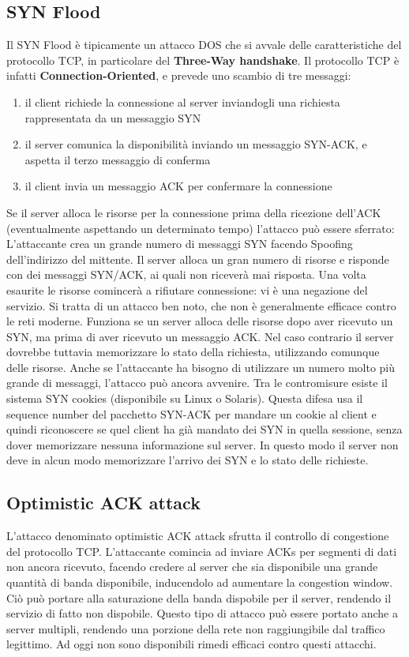 \subsection{SYN Flood}
Il SYN Flood è tipicamente un attacco DOS che si avvale delle caratteristiche del protocollo TCP, in particolare del \textbf{Three-Way handshake}. Il protocollo TCP è infatti \textbf{Connection-Oriented}, e prevede uno scambio di tre messaggi:
\begin{enumerate}
\item il client richiede la connessione al server inviandogli una richiesta rappresentata da un messaggio SYN
\item il server comunica la disponibilità inviando un messaggio SYN-ACK, e aspetta il terzo messaggio di conferma
\item il client invia un messaggio ACK per confermare la connessione
\end{enumerate}
Se il server alloca le risorse per la connessione prima della ricezione dell'ACK (eventualmente aspettando un determinato tempo) l'attacco può essere sferrato: L'attaccante crea un grande numero di messaggi SYN facendo Spoofing dell'indirizzo del mittente. Il server alloca un gran numero di risorse e risponde con dei messaggi SYN/ACK, ai quali non riceverà mai risposta. Una volta esaurite le risorse comincerà a rifiutare connessione: vi è una negazione del servizio. 
\newline \newline
Si tratta di un attacco ben noto, che non è generalmente efficace contro le reti moderne. Funziona se un server alloca delle risorse dopo aver ricevuto un SYN, ma prima di aver ricevuto un messaggio ACK. 
\newline \newline
Nel caso contrario il server dovrebbe tuttavia memorizzare lo stato della richiesta, utilizzando comunque delle risorse. Anche se l'attaccante ha bisogno di utilizzare un numero molto più grande di messaggi, l'attacco può ancora avvenire. Tra le contromisure esiste il sistema SYN cookies (disponibile su Linux o Solaris). Questa difesa usa il sequence number del pacchetto SYN-ACK per mandare un cookie al client e quindi riconoscere se quel client ha già mandato dei SYN in quella sessione, senza dover memorizzare nessuna informazione sul server. In questo modo il server non deve in alcun modo memorizzare l'arrivo dei SYN e lo stato delle richieste.

\subsection{Optimistic ACK attack}
L'attacco denominato optimistic ACK attack sfrutta il controllo di congestione del protocollo TCP. L'attaccante comincia ad inviare ACKs per segmenti di dati non ancora ricevuto, facendo credere al server che sia disponibile una grande quantità di banda disponibile, inducendolo ad aumentare la congestion window. Ciò può portare alla saturazione della banda dispobile per il server, rendendo il servizio di fatto non dispobile. Questo tipo di attacco può essere portato anche a server multipli, rendendo una porzione della rete non raggiungibile dal traffico legittimo. Ad oggi non sono disponibili rimedi efficaci contro questi attacchi.

